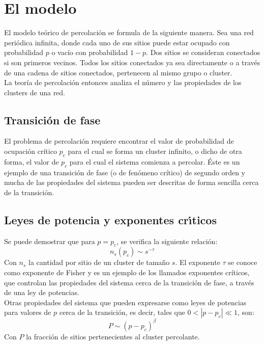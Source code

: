 \documentclass[%
 reprint,
 amsmath,amssymb,
 aps,
spanish]{revtex4-1}
\begin{document}
\section{\label{theory}El modelo}
El modelo teórico de percolación se formula de la siguiente manera. Sea una red periódica infinita, donde cada uno de sus sitios puede estar ocupado con probabilidad $p$ o vacío con probabilidad $1-p$. Dos sitios se consideran conectados si son primeros vecinos. Todos los sitios conectados ya sea directamente o a través de una cadena de sitios conectados, pertenecen al mismo grupo o cluster.\\La teoría de percolación entonces analiza el número y las propiedades de los clusters de una red.\cite{levinshtein}\cite{stauffer}\cite{havlin}

\subsection{\label{transition}Transici\'on de fase}
El problema de percolación requiere encontrar el valor de probabilidad de ocupación crítico $p_c$ para el cual se forma un cluster infinito, o dicho de otra forma, el valor de $p_c$ para el cual el sistema comienza a percolar. Éste es un ejemplo de una transición de fase (o de fenómeno crítico) de segundo orden y mucha de las propiedades del sistema pueden ser descritas de forma sencilla cerca de la transición.

\subsection{\label{critical}Leyes de potencia y exponentes cr\'\i ticos}
Se puede demostrar que para $p=p_c$, se verifica la siguiente relación:
\begin{equation}
\label{ecu:tau}
n_s(p_c)\sim s^{-\tau}
\end{equation}
Con $n_s$ la cantidad por sitio de un cluster de tamaño $s$. El exponente $\tau$ se conoce como exponente de Fisher y es un ejemplo de los llamados exponentes críticos, que controlan las propiedades del sistema cerca de la transición de fase, a través de una ley de potencias.\\
Otras propiedades del sistema que pueden expresarse como leyes de potencias para valores de $p$ cerca de la transición, es decir, tales que $0 < |p-p_c| \ll 1$, son:
\begin{equation}
\label{ecu:beta}
P\sim (p-p_c)^\beta
\end{equation}
Con $P$ la fracción de sitios pertenecientes al cluster percolante. 
\end{document}
